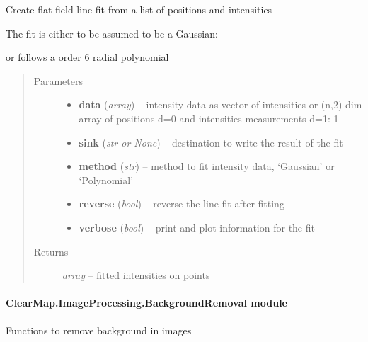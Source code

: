 \documentclass[letterpaper,10pt,english]{sphinxmanual}
\begin{document}

\begin{fulllineitems}
\label{api/ClearMap.ImageProcessing:ClearMap.ImageProcessing.IlluminationCorrection.flatfieldLineFromRegression}
Create flat field line fit from a list of positions and intensities

The fit is either to be assumed to be a Gaussian:

or follows a order 6 radial polynomial
\begin{quote}\begin{description}
\item[{Parameters}] \leavevmode\begin{itemize}
\item {} 
\textbf{data} (\emph{array}) --
intensity data as vector of intensities or (n,2) dim array of positions d=0 and intensities measurements d=1:-1

\item {} 
\textbf{sink} (\emph{str or None}) --
destination to write the result of the fit

\item {} 
\textbf{method} (\emph{str}) --
method to fit intensity data, `Gaussian' or `Polynomial'

\item {} 
\textbf{reverse} (\emph{bool}) --
reverse the line fit after fitting

\item {} 
\textbf{verbose} (\emph{bool}) --
print and plot information for the fit

\end{itemize}

\item[{Returns}] \leavevmode
\emph{array} --
fitted intensities on points

\end{description}\end{quote}

\end{fulllineitems}



\paragraph{ClearMap.ImageProcessing.BackgroundRemoval module}
\label{api/ClearMap.ImageProcessing:module-ClearMap.ImageProcessing.BackgroundRemoval}\label{api/ClearMap.ImageProcessing:clearmap-imageprocessing-backgroundremoval-module}
Functions to remove background in images
\end{document}
